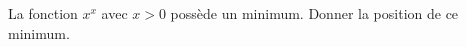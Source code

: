 \begin{exercice}\label{exoGeneral0014}

La fonction $x^x$ avec $x>0$ possède un minimum. Donner la position de ce minimum.

\end{exercice}

